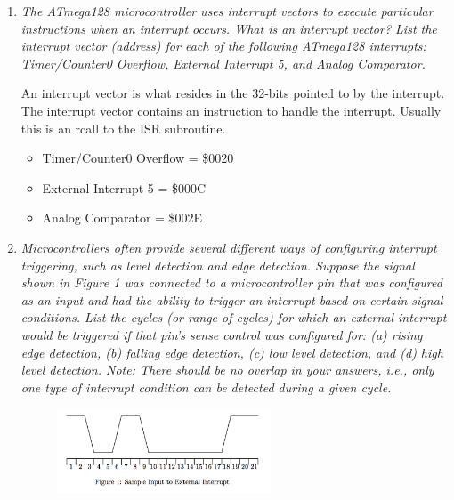 \documentclass[12pt,letterpaper]{article}
\begin{document}
\begin{enumerate}
\begin{itemize}
		\end{itemize}
	
	
	
		
		\item
		\textit{The ATmega128 microcontroller uses interrupt vectors to execute particular instructions when an interrupt occurs. What is an interrupt vector? 
		List the interrupt vector (address) for each of the following ATmega128 interrupts: Timer/Counter0 Overflow, External Interrupt 5, and Analog Comparator.}
		
		An interrupt vector is what resides in the 32-bits pointed to by the interrupt.
		The interrupt vector contains an instruction to handle the interrupt.
		Usually this is an rcall to the ISR subroutine.
		
		\begin{itemize}
			\item 
			Timer/Counter0 Overflow = \$0020
			
			
			\item 
			External Interrupt 5 = \$000C
			
			
			\item 
			Analog Comparator = \$002E
		\end{itemize}
		
		
		
		
		
		\item 
		\textit{Microcontrollers often provide several different ways of configuring interrupt triggering, such as \textit{level detection} and \textit{edge detection}. 
		Suppose the signal shown in Figure 1 was connected to a microcontroller pin that was configured as an input and had the ability to trigger an interrupt based on certain signal conditions. 
		List the cycles (or range of cycles) for which an external interrupt would be triggered if that pin’s sense control was configured for: (a) rising edge detection, (b) falling edge detection, (c) low level detection, and (d) high level detection. Note: There should be no overlap in your answers, i.e., only one type of interrupt condition can be detected during a given cycle.}
		\begin{figure}[h]
			\centering
			\includegraphics[width=0.6\textwidth]{Fig1.png}
		\end{figure}
	

\end{enumerate}
\end{document}
